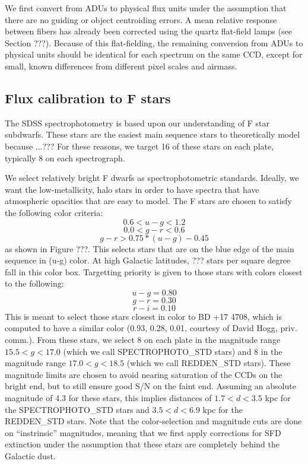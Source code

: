 \documentclass[12pt,preprint]{aastex}
\newcommand{\ergs}{{\rm ~erg~s}^{-1}}
\newcommand{\ergscmang}{{\rm ~erg~s}^{-1}{\rm cm}^{-2}{\rm\AA}^{-1}}
\begin{document}

We first convert from ADUs to physical flux units under the
assumption that there are no guiding or object centroiding errors.
A mean relative response between fibers has already been corrected
using the quartz flat-field lamps (see Section ???).
Because of this flat-fielding, the remaining conversion from ADUs
to physical units should be identical for each spectrum on the 
same CCD, except for small, known differences from different pixel scales
and airmass.

\subsection{Flux calibration to F stars}

The SDSS spectrophotometry is based upon our understanding
of F star subdwarfs.  These stars are the easiest main sequence
stars to theoretically model because ...???
For these reasons, we target 16 of these stars on each plate,
typically 8 on each spectrograph.



We select relatively bright F dwarfs as spectrophotometric 
standards.  Ideally, we want the low-metallicity, halo stars in order 
to have spectra that have atmospheric opacities that are easy to model.
The F stars are chosen to satisfy the following color criteria:
$$ 0.6 < u-g < 1.2 $$
$$ 0.0 < g-r < 0.6 $$
$$ g-r > 0.75 * (u-g) - 0.45 $$
as shown in Figure ???.
This selects stars that are on the blue edge of the main
sequence in (u-g) color.  At high Galactic latitudes,
??? stars per square degree fall in this color box.
Targetting priority is given to
those stars with colors closest to the following:
$$ u-g = 0.80 $$
$$ g-r = 0.30 $$
$$ r-i = 0.10 $$
This is meant to select those stars closest in color to BD +17 4708,
which is computed to have a similar color (0.93, 0.28, 0.01, courtesy
of David Hogg, priv. comm.).
From these stars, we select 8 on each plate in the magnitude
range $15.5 < g < 17.0$ (which we call SPECTROPHOTO\_STD stars)
and 8 in the magnitude range $17.0 < g < 18.5$ (which we call
REDDEN\_STD stars).
These magnitude limits are chosen to avoid nearing saturation
of the CCDs on the bright end, but to still ensure good S/N
on the faint end.
Assuming an absolute magnitude of 4.3 for these stars, this
implies distances of $1.7 < d < 3.5$ kpc for the SPECTROPHOTO\_STD
stars and $3.5 < d < 6.9$ kpc for the REDDEN\_STD stars.
Note that the color-selection and magnitude cuts are done on
``instrinsic'' magnitudes, meaning that we first apply corrections
for SFD extinction under the assumption that these stars are
completely behind the Galactic dust.
\end{document}

